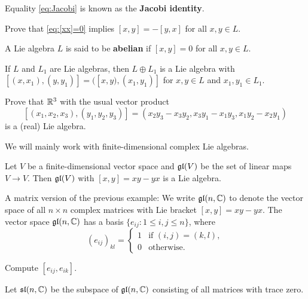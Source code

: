 Equality \eqref{eq:Jacobi} is known as the \textbf{Jacobi identity}. 

\begin{exercise}
    Prove that \eqref{eq:[xx]=0} implies $[x,y]=-[y,x]$ for all
    $x,y\in L$. 
\end{exercise}

A Lie algebra $L$ is said to be \textbf{abelian} if $[x,y]=0$ for 
all $x,y\in L$. 

\begin{exercise}
    If $L$ and $L_1$ are Lie algebras, then 
    $L\oplus L_1$ is a Lie algebra with
    $[(x,x_1),(y,y_1)]=([x,y),(x_1,y_1)]$ for $x,y\in L$ and
    $x_1,y_1\in L_1$. 
\end{exercise}

\begin{exercise}
    Prove that $\mathbb{R}^3$ with the usual vector product 
    \[
    [(x_1,x_2,x_3),(y_1,y_2,y_3)]=(x_2y_3-x_3y_2,x_3y_1-x_1y_3,x_1y_2-x_2y_1)
    \]
    is a (real) Lie algebra.     
\end{exercise}

We will mainly work with finite-dimensional complex Lie algebras.

\begin{example}
    Let $V$ be a finite-dimensional vector space and 
    $\mathfrak{gl}(V)$ be the set of linear maps $V\to V$. Then 
    $\mathfrak{gl}(V)$ with $[x,y]=xy-yx$ is a Lie algebra. 
\end{example}

A matrix version of the previous example: We write $\mathfrak{gl}(n,\mathbb{C})$ 
to denote the vector space of all $n\times n$ complex 
matrices with Lie bracket $[x,y]=xy-yx$. The vector space
$\mathfrak{gl}(n,\mathbb{C})$ has a basis $\{e_{ij}:1\leq i,j\leq n\}$, where
\[
(e_{ij})_{kl}=\begin{cases} 
    1 & \text{if $(i,j)=(k,l)$},\\
    0 & \text{otherwise}.
    \end{cases}
\]

\begin{exercise}
    Compute $[e_{ij},e_{ik}]$.
\end{exercise}

\begin{example}
    Let $\mathfrak{sl}(n,\mathbb{C})$ be the subspace of $\mathfrak{gl}(n,\mathbb{C})$ consisting
    of all matrices with trace zero. 
\end{example}


